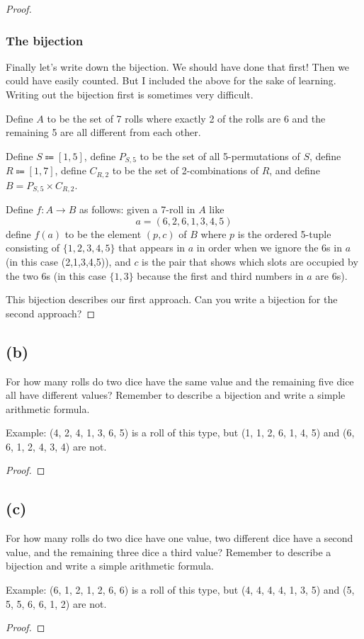 \documentclass[14pt]{extarticle}
\begin{document}
\begin{proof}
\subsubsection{The bijection}

Finally let's write down the bijection. We should have done that first! Then we could have easily counted. But I included the above for the sake of learning. Writing out the bijection first is sometimes very difficult.

Define $A$ to be the set of 7 rolls where exactly 2 of the rolls are 6 and the remaining 5 are all different from each other. 

Define $S \Coloneqq [1,5]$, define $P_{S,5}$ to be the set of all 5-permutations of $S$, define $R \Coloneqq [1,7]$, define $C_{R, 2}$ to be the set of 2-combinations of $R$, and define $B = P_{S,5} \times C_{R,2}$.

Define $f: A \to B$ as follows: given a 7-roll in $A$ like 
$$
a = (6, 2, 6, 1, 3, 4, 5)
$$
define $f(a)$ to be the element $(p, c)$ of $B$ where $p$ is the ordered 5-tuple consisting of $\{1,2,3,4,5\}$ that appears in $a$ in order when we ignore the 6s in $a$ (in this case (2,1,3,4,5)), and $c$ is the pair that shows which slots are occupied by the two 6s (in this case $\{1,3\}$ because the first and third numbers in $a$ are 6s).

This bijection describes our first approach. Can you write a bijection for the second approach?
\end{proof}
\subsection{(b)}
For how many rolls do two dice have the same value and the remaining five dice all have different values? Remember to describe a bijection and write a simple arithmetic formula.

Example: (4, 2, 4, 1, 3, 6, 5) is a roll of this type, but (1, 1, 2, 6, 1, 4, 5) and (6, 6, 1, 2, 4, 3, 4) are not.
\begin{proof}
\end{proof}
\subsection{(c)}
For how many rolls do two dice have one value, two different dice have a second value, and the remaining three dice a third value? Remember to describe a bijection and write a simple arithmetic formula.

Example: (6, 1, 2, 1, 2, 6, 6) is a roll of this type, but (4, 4, 4, 4, 1, 3, 5) and (5, 5, 5, 6, 6, 1, 2) are not.
\begin{proof}
\end{proof}
\end{document}
